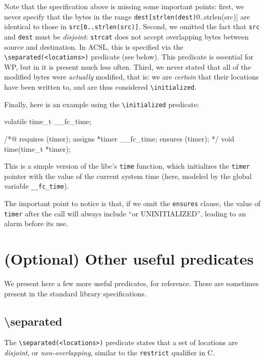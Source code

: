 \documentclass{frama-c-book}
\begin{document}
Note that the specification above is missing some important points: first, we
never specify that the bytes in the range
\verb+dest[strlen(dest)+0..strlen(src)] are identical to those in
  \verb+src[0..strlen(src)]+. Second, we omitted the fact that \texttt{src}
  and \texttt{dest} must be {\em disjoint}: \texttt{strcat} does not accept
  overlapping bytes between source and destination. In ACSL, this is specified
  via the \verb+\separated(<locations>)+ predicate (see below). This predicate is essential
  for WP, but in \Eva{} it is present much less often.
  Third, we never stated that all of the modified bytes were {\em actually}
  modified, that is: we are {\em certain} that their locations have been
  written to, and are thus considered \verb+\initialized+.

Finally, here is an example using the \verb+\initialized+ predicate:

\begin{listing-nonumber}
volatile time_t __fc_time;

/*@
  requires \valid(timer);
  assigns *timer \from __fc_time;
  ensures \initialized(timer);
*/
void time(time_t *timer);
\end{listing-nonumber}

This is a simple version of the libc's \texttt{time} function, which
initializes the \texttt{timer} pointer with the value of the current system
time (here, modeled by the global variable \verb+__fc_time+).

The important point to notice is that, if we omit the \texttt{ensures} clause,
the value of \texttt{timer} after the call will always include
``or UNINITIALIZED'', leading to an alarm before its use.

\section{(Optional) Other useful predicates}

We present here a few more useful predicates, for reference. These are
sometimes present in the \FramaC standard library specifications.

\subsection*{\textbackslash{}separated}

The \verb+\separated(<locations>)+ predicate states that a set of locations
are {\em disjoint}, or {\em non-overlapping}, similar to the \texttt{restrict}
qualifier in C.
\end{document}

